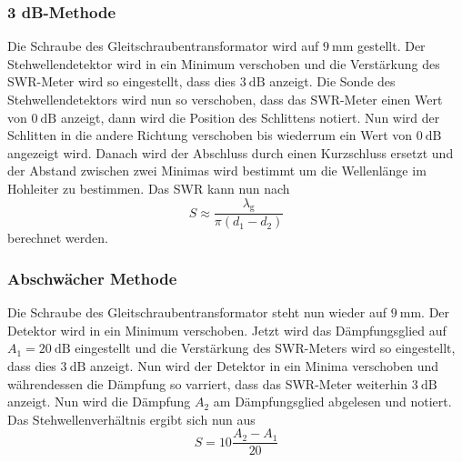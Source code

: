 \subsubsection{3 dB-Methode}
Die Schraube des Gleitschraubentransformator wird auf $\SI{9}{\milli\meter}$ gestellt.
Der Stehwellendetektor wird in ein Minimum verschoben und die Verstärkung des SWR-Meter wird so eingestellt, dass dies $\SI{3}{\dB}$ anzeigt.
Die Sonde des Stehwellendetektors wird nun so verschoben, dass das SWR-Meter einen Wert von $\SI{0}{\dB}$ anzeigt, dann wird die Position des Schlittens notiert.
Nun wird der Schlitten in die andere Richtung verschoben bis wiederrum ein Wert von $\SI{0}{\dB}$ angezeigt wird.
Danach wird der Abschluss durch einen Kurzschluss ersetzt und der Abstand zwischen zwei Minimas wird bestimmt um die Wellenlänge im Hohleiter zu bestimmen.
Das SWR kann nun nach 
\begin{equation}
    S \approx \frac{\lambda _\text{g}}{\pi \left ( d_1 - d_2 \right )}
    \label{eq:3db_SWR}
\end{equation}
berechnet werden.

\subsubsection{Abschwächer Methode}
Die Schraube des Gleitschraubentransformator steht nun wieder auf $\SI{9}{\milli \meter}$.
Der Detektor wird in ein Minimum verschoben.
Jetzt wird das Dämpfungsglied auf $A_1 = \SI{20}{\dB}$ eingestellt und die Verstärkung des SWR-Meters wird so eingestellt, dass dies $\SI{3}{\dB}$ anzeigt.
Nun wird der Detektor in ein Minima verschoben und währendessen die Dämpfung so varriert, dass das SWR-Meter weiterhin $\SI{3}{\dB}$ anzeigt.
Nun wird die Dämpfung $A_2$ am Dämpfungsglied abgelesen und notiert.
Das Stehwellenverhältnis ergibt sich nun aus 
\begin{equation}
    S = 10 \frac{A_2 -A_1}{20}
    \label{eq:daempfung_SWR}
\end{equation}